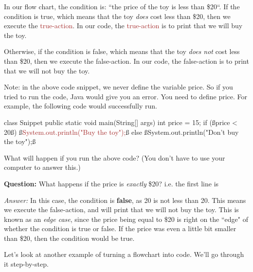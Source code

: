 In our flow chart, the \textcolor{mygreen}{condition} is: ``the price of the toy is less than \$20``. If the \textcolor{mygreen}{condition} is true, which means that the toy \emph{does} cost less than \$20, then we execute the \textcolor{Brown}{true-action}. In our code, the \textcolor{Brown}{true-action} is to print that we will buy the toy.

Otherwise, if the \textcolor{mygreen}{condition} is false, which means that the toy \emph{does not} cost less than \$20, then we execute the \textcolor{Rhodamine}{false-action}. In our code, the \textcolor{Rhodamine}{false-action} is to print that we will not buy the toy.

Note: in the above code snippet, we never define the variable \textcolor{mygreen}{price}. So if you tried to run the code, Java would give you an error. You need to define \textcolor{mygreen}{price}. For example, the following code would successfully run.

\begin{code}
class Snippet {
    public static void main(String[] args) {
        int price = 15;
        if (ß\textcolor{mygreen}{price < 20}ß) 
        {
            ß\textcolor{Brown}{System.out.println("Buy the toy");}ß
        }
        else
        {
            ß\textcolor{Rhodamine}{System.out.println("Don't buy the toy");}ß
        }
    }
}
\end{code}

\begin{exercise}
What will happen if you run the above code? (You don't have to use your computer to answer this.)
\end{exercise}

\noindent \textbf{Question: } What happens if the price is \emph{exactly} \$20? i.e. the first line is 

\noindent \textit{Answer: } In this case, the \textcolor{mygreen}{condition} is \textbf{false}, as 20 is not less than 20. This means we execute the \textcolor{Rhodamine}{false-action}, and will print that we will not buy the toy.
This is known as an \emph{edge case}, since the price being equal to \$20 is right on the ``edge" of whether the \textcolor{mygreen}{condition} is true or false. If the price was even a little bit smaller than \$20, then the \textcolor{mygreen}{condition} would be true.

Let's look at another example of turning a flowchart into code. We'll go through it step-by-step.

